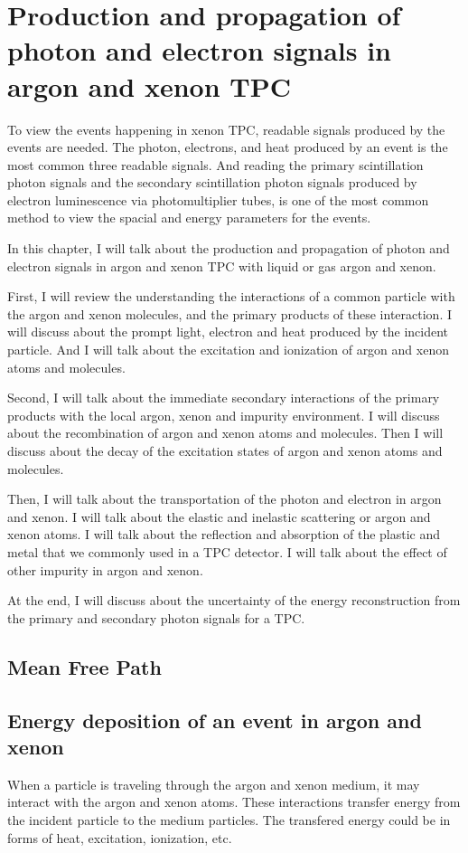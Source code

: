 \label{Chapter8}
\chapter{Production and propagation of photon and electron signals in argon and xenon TPC}
To view the events happening in xenon TPC, readable signals produced by the events are needed. The photon, electrons, and heat produced by an event is the most common three readable signals. And reading the primary scintillation photon signals and the secondary scintillation photon signals produced by electron luminescence via photomultiplier tubes, is one of the most common method to view the spacial and energy parameters for the events.    

In this chapter, I will talk about the production and propagation of photon and electron signals in argon and xenon TPC with liquid or gas argon and xenon. 

First, I will review the understanding the interactions of a common particle with the argon and xenon molecules, and the primary products of these interaction. I will discuss about the prompt light, electron and heat produced by the incident particle. And I will talk about the excitation and ionization of argon and xenon atoms and molecules. 

Second, I will talk about the immediate secondary interactions of the primary products with the local argon, xenon and impurity environment. I will discuss about the recombination of argon and xenon atoms and molecules. Then I will discuss about the decay of the excitation states of argon and xenon atoms and molecules.

Then, I will talk about the transportation of the photon and electron in argon and xenon. I will talk about the elastic and inelastic scattering or argon and xenon atoms. I will talk about the reflection and absorption of the plastic and metal that we commonly used in a TPC detector. I will talk about the effect of other impurity in argon and xenon.

At the end, I will discuss about the uncertainty of the energy reconstruction from the primary and secondary photon signals for a TPC. 

\section{Mean Free Path}

\section{Energy deposition of an event in argon and xenon}
When a particle is traveling through the argon and xenon medium, it may interact with the argon and xenon atoms. These interactions transfer energy from the incident particle to the medium particles. The transfered energy could be in forms of heat, excitation, ionization, etc.    

